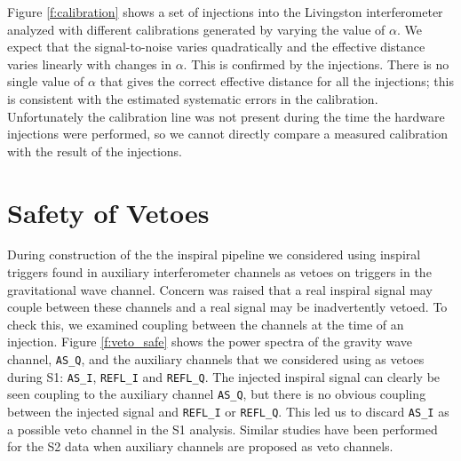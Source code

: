 Figure \ref{f:calibration} shows a set of injections into the Livingston
interferometer analyzed with different calibrations generated by varying the
value of $\alpha$. We expect that the signal-to-noise varies quadratically and
the effective distance varies linearly with changes in $\alpha$\cite{Allen:1996}.
This is confirmed by the injections.  There is no single value of $\alpha$
that gives the correct effective distance for all the injections; this is
consistent with the estimated systematic errors in the calibration.
Unfortunately the calibration line was not present during the time the
hardware injections were performed, so we cannot directly compare a measured
calibration with the result of the injections.

\section{Safety of Vetoes}
\label{s:safety}

During construction of the the inspiral pipeline we considered using inspiral
triggers found in auxiliary interferometer channels as vetoes on triggers in
the gravitational wave channel. Concern was raised that a real inspiral signal
may couple between these channels and a real signal may be inadvertently
vetoed.  To check this, we examined coupling between the channels at the time
of an injection.  Figure \ref{f:veto_safe} shows the power spectra of the
gravity wave channel, \texttt{AS\_Q}, and the auxiliary channels that we
considered using as vetoes during S1: \texttt{AS\_I}, \texttt{REFL\_I} and
\texttt{REFL\_Q}.  The injected inspiral signal can clearly be seen coupling
to the auxiliary channel \texttt{AS\_Q}, but there is no obvious coupling
between the injected signal and \texttt{REFL\_I} or \texttt{REFL\_Q}. This
led us to discard \texttt{AS\_I} as a possible veto channel in the S1
analysis. Similar studies have been performed for the S2 data when auxiliary
channels are proposed as veto channels.

\newpage

